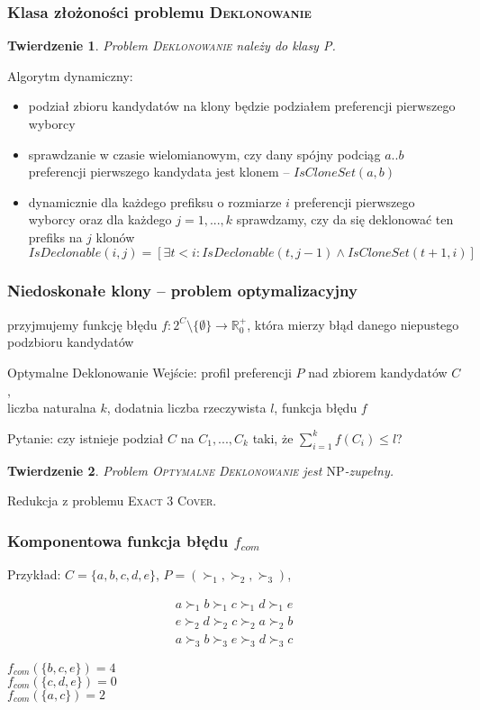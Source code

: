 \documentclass{beamer}
\newtheorem{tw}{Twierdzenie}
\begin{document}
\begin{frame} \frametitle{Klasa złożoności problemu \textsc{Deklonowanie}}
	\begin{tw}
		Problem \textsc{Deklonowanie} należy do klasy P.
	\end{tw}
	\vfill
	Algorytm dynamiczny:
	\begin{itemize}
		\item podział zbioru kandydatów na klony będzie podziałem preferencji pierwszego wyborcy
		\item sprawdzanie w czasie wielomianowym, czy dany spójny podciąg $a..b$ preferencji
			pierwszego kandydata jest klonem -- $IsCloneSet(a, b)$
		\item dynamicznie dla każdego prefiksu o rozmiarze $i$ preferencji pierwszego wyborcy
			oraz dla każdego $j=1,...,k$ sprawdzamy, czy da się deklonować ten prefiks na $j$ klonów \\
			$IsDeclonable(i,j) = [\exists t < i : IsDeclonable(t, j-1) \wedge IsCloneSet(t+1, i)]$
	\end{itemize}
\end{frame} 

\begin{frame} \frametitle{Niedoskonałe klony -- problem optymalizacyjny}
  przyjmujemy funkcję błędu $f: 2^C \setminus \{\emptyset\} \rightarrow \mathbb{R}_0^+$,
  która mierzy błąd danego niepustego podzbioru kandydatów 
  
  
	\begin{aproblem}{Optymalne Deklonowanie}
		Wejście: profil preferencji $P$ nad zbiorem kandydatów $C$,\\
			liczba naturalna $k$, dodatnia liczba rzeczywista $l$, funkcja błędu $f$

		Pytanie: czy istnieje podział $C$ na $C_1, ..., C_k$ taki, że $\sum_{i=1}^k f(C_i) \leq l$?
	\end{aproblem}

	\vfill
	
	\begin{tw}
		Problem \textsc{Optymalne Deklonowanie} jest $\text{NP}$-zupełny.
	\end{tw}
	
	Redukcja z problemu \textsc{Exact 3 Cover}.
\end{frame}

\begin{frame} \frametitle{Komponentowa funkcja błędu $f_{com}$}
	Przykład: $C = \{a, b, c, d, e\}$, $P = (\succ_1, \succ_2, \succ_3)$,
	
	\begin{align*}
		a \succ_1 b \succ_1 c \succ_1 d \succ_1 e\\
		e \succ_2 d \succ_2 c \succ_2 a \succ_2 b\\
		a \succ_3 b \succ_3 e \succ_3 d \succ_3 c
	\end{align*}
	\vfill
	
	$f_{com}(\{b,c,e\}) = 4$ \\
	$f_{com}(\{c,d,e\}) = 0$ \\
	$f_{com}(\{a,c\}) = 2$
\end{frame}
\end{document}
